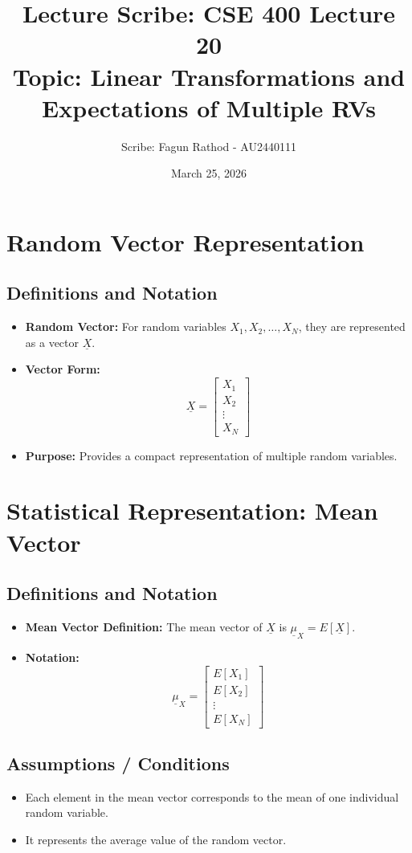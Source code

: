 \documentclass[12pt]{article}
\title{Lecture Scribe: CSE 400 Lecture 20 \\ \large Topic: Linear Transformations and Expectations of Multiple RVs}
\author{Scribe: Fagun Rathod - AU2440111}
\date{March 25, 2026}
\begin{document}
\maketitle

\section{Random Vector Representation}
\subsection{Definitions and Notation}
\begin{itemize}
    \item \textbf{Random Vector:} For random variables $X_{1}, X_{2}, \dots, X_{N}$, they are represented as a vector $\underline{X}$.
    \item \textbf{Vector Form:} 
    \[
    \underline{X} = \begin{bmatrix} X_{1} \\ X_{2} \\ \vdots \\ X_{N} \end{bmatrix}
    \]
    \item \textbf{Purpose:} Provides a compact representation of multiple random variables.
\end{itemize}

\hr
\section{Statistical Representation: Mean Vector}
\subsection{Definitions and Notation}
\begin{itemize}
    \item \textbf{Mean Vector Definition:} The mean vector of $\underline{X}$ is $\underline{\mu}_{X} = E[\underline{X}]$.
    \item \textbf{Notation:} 
    \[
    \underline{\mu}_{X} = \begin{bmatrix} E[X_{1}] \\ E[X_{2}] \\ \vdots \\ E[X_{N}] \end{bmatrix}
    \]
\end{itemize}

\subsection{Assumptions / Conditions}
\begin{itemize}
    \item Each element in the mean vector corresponds to the mean of one individual random variable.
    \item It represents the average value of the random vector.
\end{itemize}
\end{document}
